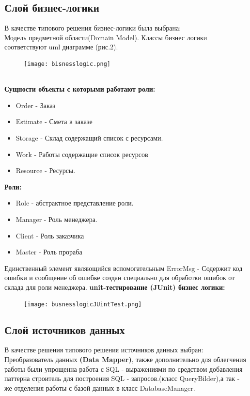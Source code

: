 \documentclass[12pt,a4paper,titlepage]{article}
\begin{document}
\subsection{Слой бизнес-логики}
В качестве типового решения бизнес-логики была выбрана: 
\\
Модель предметной области(Domain Model).
Классы бизнес логики соответствуют uml диаграмме (рис.2).
\begin{figure}[!ht]
\texttt{[image: bisnesslogic.png]}\caption{}
\end{figure}
\\
\textbf{Сущности объекты с которыми работают роли:}
\begin{itemize}
\item Order - Заказ
\item Estimate - Смета в заказе
\item Storage - Склад содержащий список с ресурсами.
\item Work - Работы содержащие список ресурсов
\item Resource - Ресурсы.
\end{itemize}

\textbf{Роли:}
\begin{itemize}
\item Role - абстрактное представление роли.
\item Manager - Роль менеджера.
\item Client - Роль заказчика
\item Master - Роль прораба
\end{itemize}
Единственный элемент являющийся вспомогательным
ErrorMsg - Содержит код ошибки и сообщение об ошибке
создан специально для обработки ошибок от склада для роли менеджера.
\newpage
\textbf{unit-тестирование (JUnit) бизнес логики:}
\begin{figure}[!ht]
\texttt{[image: busnesslogicJUintTest.png]}\caption{}
\end{figure}
\newpage
\subsection{Слой источников данных}
В качестве решения типового решения
источников данных выбран:
\\
Преобразователь данных \textbf{(Data Mapper)}, также дополнительно для облегчения работы были упрощенна работа с SQL - выражениями по средством добавления паттерна строитель для построения SQL - запросов.(класс QueryBilder),а так - же отделения работы с базой данных в класс DatabaseManager.
\end{document}
